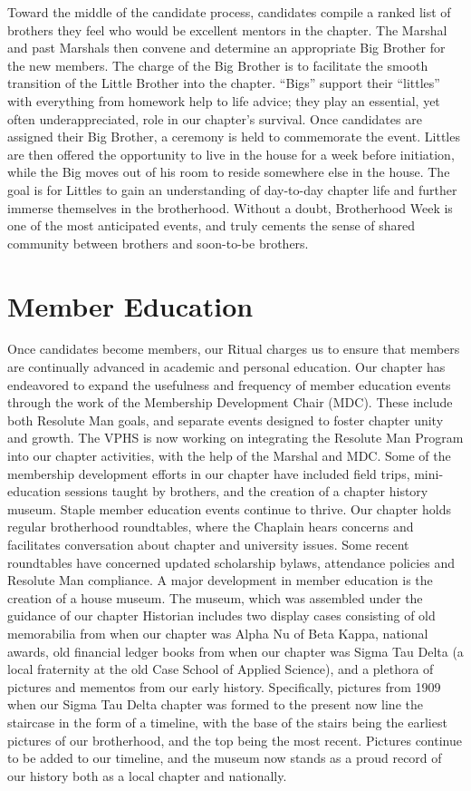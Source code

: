     Toward the middle of the candidate process, candidates compile a ranked list of brothers they feel who would be excellent mentors in the chapter. The Marshal and past Marshals then convene and determine an appropriate Big Brother for the new members. The charge of the Big Brother is to facilitate the smooth transition of the Little Brother into the chapter. “Bigs” support their ``littles'' with everything from homework help to life advice; they play an essential, yet often underappreciated, role in our chapter’s survival. Once candidates are assigned their Big Brother, a ceremony is held to commemorate the event. Littles are then offered the opportunity to live in the house for a week before initiation, while the Big moves out of his room to reside somewhere else in the house. The goal is for Littles to gain an understanding of day-to-day chapter life and further immerse themselves in the brotherhood. Without a doubt, Brotherhood Week is one of the most anticipated events, and truly cements the sense of shared community between brothers and soon-to-be brothers.
   
  \section*{Member Education}
      Once candidates become members, our Ritual charges us to ensure that members are continually advanced in academic and personal education. Our chapter has endeavored to expand the usefulness and frequency of member education events through the work of the Membership Development Chair (MDC). These include both Resolute Man goals, and separate events designed to foster chapter unity and growth. The VPHS is now working on integrating the Resolute Man Program into our chapter activities, with the help of the Marshal and MDC. Some of the membership development efforts in our chapter have included field trips, mini-education sessions taught by brothers, and the creation of a chapter history museum. Staple member education events continue to thrive. Our chapter holds regular brotherhood roundtables, where the Chaplain hears concerns and facilitates conversation about chapter and university issues. Some recent roundtables have concerned updated scholarship bylaws, attendance policies and Resolute Man compliance. A major development in member education is the creation of a house museum. The museum, which was assembled under the guidance of our chapter Historian includes two display cases consisting of old memorabilia from when our chapter was Alpha Nu of Beta Kappa, national awards, old financial ledger books from when our chapter was Sigma Tau Delta (a local fraternity at the old Case School of Applied Science), and a plethora of pictures and mementos from our early history. Specifically, pictures from 1909 when our Sigma Tau Delta chapter was formed to the present now line the staircase in the form of a timeline, with the base of the stairs being the earliest pictures of our brotherhood, and the top being the most recent. Pictures continue to be added to our timeline, and the museum now stands as a proud record of our history both as a local chapter and nationally.